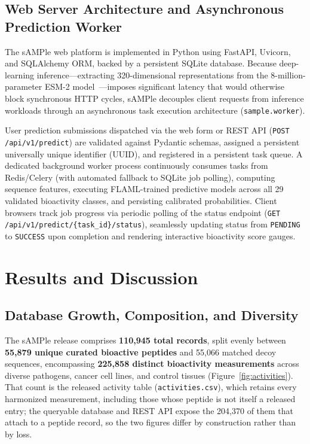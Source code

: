 \documentclass[unnumsec,webpdf,contemporary,large]{oup-authoring-template}%
\begin{document}
\subsection{Web Server Architecture and Asynchronous Prediction Worker}

The sAMPle web platform is implemented in Python using FastAPI, Uvicorn, and SQLAlchemy ORM, backed by a persistent SQLite database. Because deep-learning inference—extracting 320-dimensional representations from the 8-million-parameter ESM-2 model~\cite{lin2023evolutionary}—imposes significant latency that would otherwise block synchronous HTTP cycles, sAMPle decouples client requests from inference workloads through an asynchronous task execution architecture (\texttt{sample.worker}).

User prediction submissions dispatched via the web form or REST API (\texttt{POST /api/v1/predict}) are validated against Pydantic schemas, assigned a persistent universally unique identifier (UUID), and registered in a persistent task queue. A dedicated background worker process continuously consumes tasks from Redis/Celery (with automated fallback to SQLite job polling), computing sequence features, executing FLAML-trained predictive models across all 29 validated bioactivity classes, and persisting calibrated probabilities. Client browsers track job progress via periodic polling of the status endpoint (\texttt{GET /api/v1/predict/\{task\_id\}/status}), seamlessly updating status from \texttt{PENDING} to \texttt{SUCCESS} upon completion and rendering interactive bioactivity score gauges.

\section{Results and Discussion}

\subsection{Database Growth, Composition, and Diversity}

The sAMPle release comprises \textbf{110,945 total records}, split evenly between \textbf{55,879 unique curated bioactive peptides} and 55,066 matched decoy sequences, encompassing \textbf{225,858 distinct bioactivity measurements} across diverse pathogens, cancer cell lines, and control tissues (Figure~\ref{fig:activities}). That count is the released activity table (\texttt{activities.csv}), which retains every harmonized measurement, including those whose peptide is not itself a released entry; the queryable database and REST API expose the 204,370 of them that attach to a peptide record, so the two figures differ by construction rather than by loss.
\end{document}
